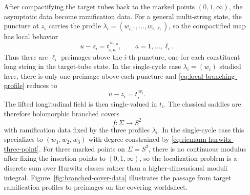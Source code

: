 \documentclass[11pt]{article}
\begin{document}
After compactifying the target tubes back to the marked points $(0,1,\infty)$, the asymptotic data become ramification data. For a general multi-string state, the puncture at $z_i$ carries the profile $\lambda_i=(w_{i,1},\dots,w_{i,\ell_i})$, so the compactified map has local behavior
\begin{equation}\label{eq:local-branching-profile}
u-z_i=t_{i,a}^{\,w_{i,a}},
\qquad
a=1,\dots,\ell_i.
\end{equation}
Thus there are $\ell_i$ preimages above the $i$-th puncture, one for each constituent long string in the target-tube state. In the single-cycle case $\lambda_i=(w_i)$ studied here, there is only one preimage above each puncture and \eqref{eq:local-branching-profile} reduces to
\begin{equation}\label{eq:local-branching}
u-z_i=t_i^{\,w_i}.
\end{equation}
The lifted longitudinal field is then single-valued in $t_i$. The classical saddles are therefore holomorphic branched covers
\begin{equation}\label{eq:branched-cover-worldsheet}
f:\Sigma\to S^2
\end{equation}
with ramification data fixed by the three profiles $\lambda_i$. In the single-cycle case this specializes to $(w_1,w_2,w_3)$ with degree constrained by \eqref{eq:riemann-hurwitz-three-point}. For three marked points on $\Sigma=S^2$, there is no continuous modulus after fixing the insertion points to $(0,1,\infty)$, so the localization problem is a discrete sum over Hurwitz classes rather than a higher-dimensional moduli integral. Figure~\ref{fig:branched-cover-data} illustrates the passage from target ramification profiles to preimages on the covering worldsheet.
\end{document}
